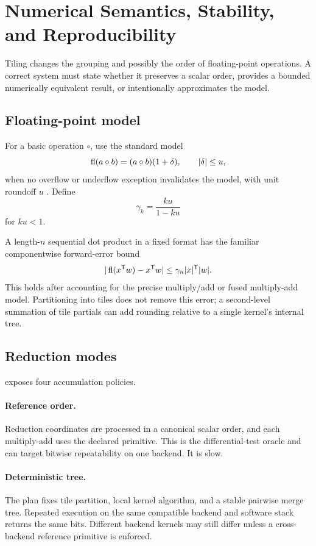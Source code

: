\section{Numerical Semantics, Stability, and Reproducibility}
\label{sec:numerics}

Tiling changes the grouping and possibly the order of floating-point operations. A correct system must state whether it preserves a scalar order, provides a bounded numerically equivalent result, or intentionally approximates the model.

\subsection{Floating-point model}

For a basic operation $\circ$, use the standard model
\[
  \operatorname{fl}(a\circ b)=(a\circ b)(1+\delta),\qquad |\delta|\le u,
\]
when no overflow or underflow exception invalidates the model, with unit roundoff $u$ \cite{higham2002accuracy,ieee754}. Define
\[
  \gamma_k=\frac{ku}{1-ku}
\]
for $ku<1$.

A length-$n$ sequential dot product in a fixed format has the familiar componentwise forward-error bound
\[
  |\operatorname{fl}(x^{\mathsf T}w)-x^{\mathsf T}w|
  \le \gamma_n |x|^{\mathsf T}|w|.
\]
This holds after accounting for the precise multiply/add or fused multiply-add model. Partitioning into tiles does not remove this error; a second-level summation of tile partials can add rounding relative to a single kernel's internal tree.

\subsection{Reduction modes}

\AMS exposes four accumulation policies.

\paragraph{Reference order.}
Reduction coordinates are processed in a canonical scalar order, and each multiply-add uses the declared primitive. This is the differential-test oracle and can target bitwise repeatability on one backend. It is slow.

\paragraph{Deterministic tree.}
The plan fixes tile partition, local kernel algorithm, and a stable pairwise merge tree. Repeated execution on the same compatible backend and software stack returns the same bits. Different backend kernels may still differ unless a cross-backend reference primitive is enforced.

